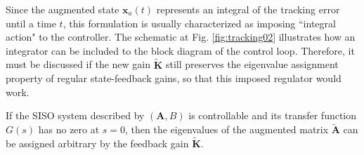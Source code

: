 \documentclass[a4paper,11pt]{book}
\numberwithin{figure}{chapter}
\numberwithin{equation}{chapter}
\numberwithin{table}{chapter}
\newtheorem{theorem}{Theorem}[chapter]
\theoremstyle{definition}
\newcounter{boxed-theorem}
\newenvironment{boxed-theorem}[1]
{\colorlet{shadecolor}{pastelBlue2!10} \begin{shaded} \begin{theorem}{#1}}
{\end{theorem} \end{shaded}}
\newcounter{boxed-definition}
\newcounter{boxed-example}
\begin{document}
Since the augmented state $\bm{x}_a(t)$ represents an integral of the tracking error until a time $t$, this formulation is usually characterized as imposing ``integral action" to the controller. The schematic at Fig. \ref{fig:tracking02} illustrates how an integrator can be included to the block diagram of the control loop. Therefore, it must be discussed if the new gain $\tilde{\bm{K}}$ still preserves the eigenvalue assignment property of regular state-feedback gains, so that this imposed regulator would work.

\begin{boxed-theorem}{} \label{th:augmentedCtrb}
    If the SISO system described by $(\bm{A}, B)$ is controllable and its transfer function $G(s)$ has no zero at $s = 0$, then the eigenvalues of the augmented matrix $\tilde{\bm{A}}$ can be assigned arbitrary by the feedback gain $\tilde{\bm{K}}$.
\end{boxed-theorem}
\end{document}
